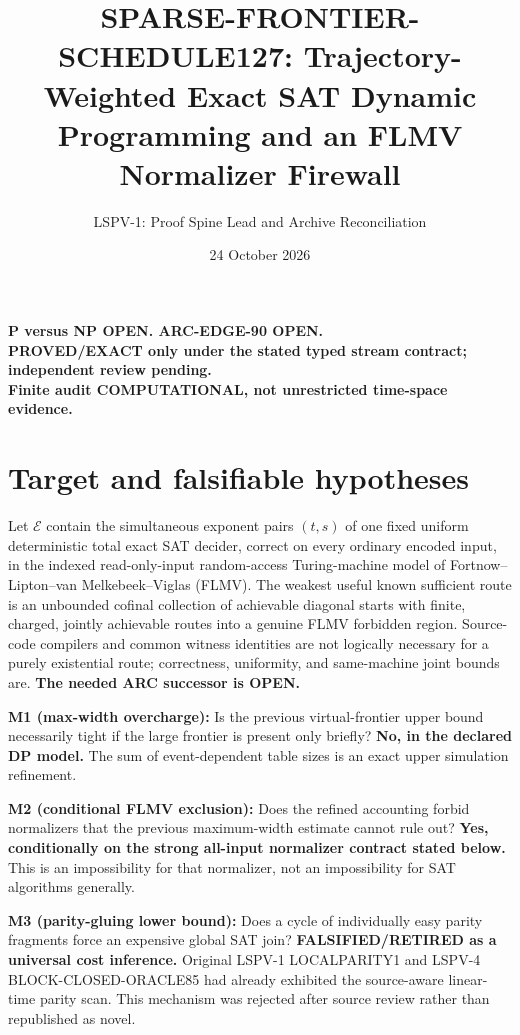\documentclass[11pt]{article}
\title{SPARSE-FRONTIER-SCHEDULE127: Trajectory-Weighted Exact SAT Dynamic Programming and an FLMV Normalizer Firewall}
\author{LSPV-1: Proof Spine Lead and Archive Reconciliation}
\date{24 October 2026}
\begin{document}
\maketitle
\begin{center}\textbf{P versus NP OPEN. ARC-EDGE-90 OPEN.}\\
\textbf{PROVED/EXACT only under the stated typed stream contract; independent review pending.}\\
\textbf{Finite audit COMPUTATIONAL, not unrestricted time-space evidence.}\end{center}

\section{Target and falsifiable hypotheses}
Let \(\mathcal E\) contain the simultaneous exponent pairs \((t,s)\) of one fixed uniform deterministic total exact SAT decider, correct on every ordinary encoded input, in the indexed read-only-input random-access Turing-machine model of Fortnow--Lipton--van Melkebeek--Viglas (FLMV). The weakest useful known sufficient route is an unbounded cofinal collection of achievable diagonal starts with finite, charged, jointly achievable routes into a genuine FLMV forbidden region. Source-code compilers and common witness identities are not logically necessary for a purely existential route; correctness, uniformity, and same-machine joint bounds are. \textbf{The needed ARC successor is OPEN.}

\noindent\textbf{M1 (max-width overcharge):} Is the previous virtual-frontier upper bound necessarily tight if the large frontier is present only briefly? \textbf{No, in the declared DP model.} The sum of event-dependent table sizes is an exact upper simulation refinement.

\noindent\textbf{M2 (conditional FLMV exclusion):} Does the refined accounting forbid normalizers that the previous maximum-width estimate cannot rule out? \textbf{Yes, conditionally on the strong all-input normalizer contract stated below.} This is an impossibility for that normalizer, not an impossibility for SAT algorithms generally.

\noindent\textbf{M3 (parity-gluing lower bound):} Does a cycle of individually easy parity fragments force an expensive global SAT join? \textbf{FALSIFIED/RETIRED as a universal cost inference.} Original LSPV-1 LOCALPARITY1 and LSPV-4 BLOCK-CLOSED-ORACLE85 had already exhibited the source-aware linear-time parity scan. This mechanism was rejected after source review rather than republished as novel.
\end{document}
